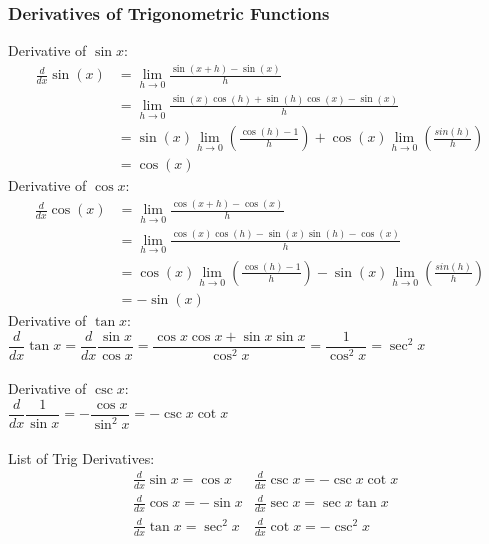 \subsubsection{Derivatives of Trigonometric Functions}
Derivative of $\sin x$:
\begin{align*}
    \frac{d}{dx}\sin (x)&=\lim_{h\to 0}\frac{\sin(x+h)-\sin (x)}{h}\\
    &=\lim_{h\to 0}\frac{\sin(x)\cos(h)+\sin(h)\cos(x)-\sin(x)}{h}\\
    &=\sin(x)\lim_{h\to 0}\left(\frac{\cos(h)-1}{h}\right)+\cos(x)\lim_{h\to 0}\left(\frac{sin(h)}{h}\right)\\
    &=\cos(x)
\end{align*}
Derivative of $\cos x$:
\begin{align*}
    \frac{d}{dx}\cos(x)&=\lim_{h\to 0}\frac{\cos(x+h)-\cos(x)}{h}\\
    &=\lim_{h\to 0}\frac{\cos(x)\cos(h)-\sin(x)\sin(h)-\cos(x)}{h}\\
    &=\cos(x)\lim_{h\to 0}\left(\frac{\cos(h)-1}{h}\right)-\sin(x)\lim_{h\to 0}\left(\frac{sin(h)}{h}\right)\\
    &=-\sin(x)
\end{align*}
Derivative of $\tan x$:\\
$\dfrac{d}{dx}\tan x=\dfrac{d}{dx}\dfrac{\sin x}{\cos x}=\dfrac{\cos x\cos x+\sin x\sin x}{\cos^2x}=\dfrac{1}{\cos^2x}=\sec^2x$\\
\\
Derivative of $\csc x$:\\
$\dfrac{d}{dx}\dfrac{1}{\sin x}=-\dfrac{\cos x}{\sin^2 x}=-\csc x\cot x$\\
\\
List of Trig Derivatives:\\
\begin{align*}
    &\frac{d}{dx}\sin x=\cos x &\frac{d}{dx}\csc x = -\csc x\cot x\\
    &\frac{d}{dx}\cos x=-\sin x &\frac{d}{dx}\sec x=\sec x\tan x\\
    &\frac{d}{dx}\tan x =\sec^2 x &\frac{d}{dx}\cot x=-\csc^2 x
\end{align*}

